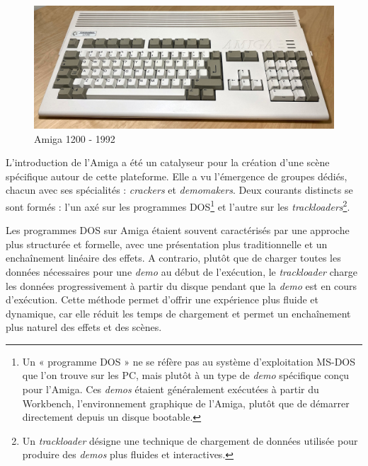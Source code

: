 \begin{figure}[h]
  \hfill
  \begin{minipage}[b]{0.30\linewidth}
    \centering
    \includegraphics[width=\linewidth]{images/demoscene/amiga1200.png}
    \caption{Amiga 1200 - 1992}
    \label{am1200}
  \end{minipage}
  \label{chaos1}
\end{figure}




L'introduction de l'Amiga a été un catalyseur pour la création d'une scène spécifique autour de cette plateforme. Elle a vu l'émergence de groupes dédiés, chacun avec ses spécialités : \textit{crackers} et \textit{demomakers}. Deux courants distincts se sont formés : l'un axé sur les programmes DOS\footnote{Un « programme DOS » ne se réfère pas au système d'exploitation MS-DOS que l'on trouve sur les PC, mais plutôt à un type de \textit{demo} spécifique conçu pour l'Amiga. Ces \textit{demos} étaient généralement exécutées à partir du Workbench, l'environnement graphique de l'Amiga, plutôt que de démarrer directement depuis un disque bootable.} et l'autre sur les \textit{trackloaders}\footnote{Un \textit{trackloader} désigne une technique de chargement de données utilisée pour produire des \textit{demos} plus fluides et interactives.}. 

Les programmes DOS sur Amiga étaient souvent caractérisés par une approche plus structurée et formelle, avec une présentation plus traditionnelle et un enchaînement linéaire des effets. A contrario, plutôt que de charger toutes les données nécessaires pour une \textit{demo} au début de l'exécution, le \textit{trackloader} charge les données progressivement à partir du disque pendant que la \textit{demo} est en cours d'exécution. Cette méthode permet d'offrir une expérience plus fluide et dynamique, car elle réduit les temps de chargement et permet un enchaînement plus naturel des effets et des scènes.



